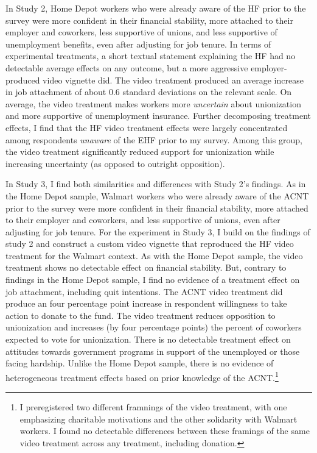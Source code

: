 \documentclass[
  11pt,
  oneside]{article}
\begin{document}
In Study 2, Home Depot workers who were already aware of the HF prior to the survey were more confident in their financial stability, more attached to their employer and coworkers, less supportive of unions, and less supportive of unemployment benefits, even after adjusting for job tenure. In terms of experimental treatments, a short textual statement explaining the HF had no detectable average effects on any outcome, but a more aggressive employer-produced video vignette did. The video treatment produced an average increase in job attachment of about 0.6 standard deviations on the relevant scale. On average, the video treatment makes workers more \emph{uncertain} about unionization and more supportive of unemployment insurance. Further decomposing treatment effects, I find that the HF video treatment effects were largely concentrated among respondents \emph{unaware} of the EHF prior to my survey. Among this group, the video treatment significantly reduced support for unionization while increasing uncertainty (as opposed to outright opposition).

In Study 3, I find both similarities and differences with Study 2's findings. As in the Home Depot sample, Walmart workers who were already aware of the ACNT prior to the survey were more confident in their financial stability, more attached to their employer and coworkers, and less supportive of unions, even after adjusting for job tenure. For the experiment in Study 3, I build on the findings of study 2 and construct a custom video vignette that reproduced the HF video treatment for the Walmart context. As with the Home Depot sample, the video treatment shows no detectable effect on financial stability. But, contrary to findings in the Home Depot sample, I find no evidence of a treatment effect on job attachment, including quit intentions. The ACNT video treatment did produce an four percentage point increase in respondent willingness to take action to donate to the fund. The video treatment reduces opposition to unionization and increases (by four percentage points) the percent of coworkers expected to vote for unionization. There is no detectable treatment effect on attitudes towards government programs in support of the unemployed or those facing hardship. Unlike the Home Depot sample, there is no evidence of heterogeneous treatment effects based on prior knowledge of the ACNT.\footnote{I preregistered two different framnings of the video treatment, with one emphasizing charitable motivations and the other solidarity with Walmart workers. I found no detectable differences between these framings of the same video treatment across any treatment, including donation.}
\end{document}
